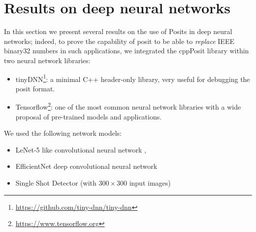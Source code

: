 \section{Results on deep neural networks}

In this section we present several results on the use of Posits in deep neural networks; indeed, to prove the capability of posit to be able to \textit{replace} IEEE binary32 numbers in such applications, we integrated the cppPosit library within two neural network libraries:
\begin{itemize}
    \item tinyDNN\footnote{\url{https://github.com/tiny-dnn/tiny-dnn}}: a minimal C++ header-only library, very useful for debugging the posit format.
    \item Tensorflow\footnote{\url{https://www.tensorflow.org}}: one of the most common neural network libraries with a wide proposal of pre-trained models and applications.
\end{itemize}

We used the following network models:
\begin{itemize}
    \item LeNet-5 like convolutional neural network \cite{lecunlenet}, \
    \item EfficientNet deep convolutional neural network \cite{tan2020efficientdet}
    \item Single Shot Detector (with $300\times 300$ input images) \cite{Liu_2016}
\end{itemize}

